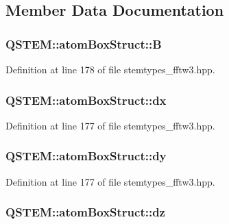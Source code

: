 \subsection{Member Data Documentation}
\hypertarget{struct_q_s_t_e_m_1_1atom_box_struct_ae6916aa8e23a249f4181ec7d630c9398}{
\subsubsection[{B}]{ Q\-S\-T\-E\-M\-::atom\-Box\-Struct\-::\-B}}\label{struct_q_s_t_e_m_1_1atom_box_struct_ae6916aa8e23a249f4181ec7d630c9398}


Definition at line 178 of file stemtypes\-\_\-fftw3.\-hpp.

\hypertarget{struct_q_s_t_e_m_1_1atom_box_struct_a9c69c6f57952718e196185a37510c066}{
\subsubsection[{dx}]{ Q\-S\-T\-E\-M\-::atom\-Box\-Struct\-::dx}}\label{struct_q_s_t_e_m_1_1atom_box_struct_a9c69c6f57952718e196185a37510c066}


Definition at line 177 of file stemtypes\-\_\-fftw3.\-hpp.

\hypertarget{struct_q_s_t_e_m_1_1atom_box_struct_a326ce8d29e57e2a02cf4fa833bcb577c}{
\subsubsection[{dy}]{ Q\-S\-T\-E\-M\-::atom\-Box\-Struct\-::dy}}\label{struct_q_s_t_e_m_1_1atom_box_struct_a326ce8d29e57e2a02cf4fa833bcb577c}


Definition at line 177 of file stemtypes\-\_\-fftw3.\-hpp.

\hypertarget{struct_q_s_t_e_m_1_1atom_box_struct_add07ac6b767c04bb5dc4d64636200ac4}{
\subsubsection[{dz}]{ Q\-S\-T\-E\-M\-::atom\-Box\-Struct\-::dz}}\label{struct_q_s_t_e_m_1_1atom_box_struct_add07ac6b767c04bb5dc4d64636200ac4}


